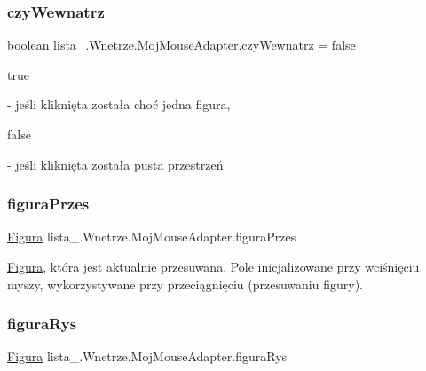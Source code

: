 \subsubsection{\texorpdfstring{czy\+Wewnatrz}{czyWewnatrz}}
{\footnotesize\ttfamily boolean lista\+\_.\+Wnetrze.\+Moj\+Mouse\+Adapter.\+czy\+Wewnatrz = false\hspace{0.3cm}{\ttfamily [private]}}


\begin{DoxyCode}
\textcolor{keyword}{true} 
\end{DoxyCode}
 -\/ jeśli kliknięta została choć jedna figura,
\begin{DoxyCode}
\textcolor{keyword}{false} 
\end{DoxyCode}
 -\/ jeśli kliknięta została pusta przestrzeń \mbox{\label{classlista__5_1_1_wnetrze_1_1_moj_mouse_adapter_a99de9fbdf459dc4783c71017a73cae3a}} 
\subsubsection{\texorpdfstring{figura\+Przes}{figuraPrzes}}
{\footnotesize\ttfamily \mbox{\hyperlink{interfacelista__5_1_1_figura}{Figura}} lista\+\_.\+Wnetrze.\+Moj\+Mouse\+Adapter.\+figura\+Przes\hspace{0.3cm}{\ttfamily [private]}}

\mbox{\hyperlink{interfacelista__5_1_1_figura}{Figura}}, która jest aktualnie przesuwana. Pole inicjalizowane przy wciśnięciu myszy, wykorzystywane przy przeciągnięciu (przesuwaniu figury). \mbox{\label{classlista__5_1_1_wnetrze_1_1_moj_mouse_adapter_a21bbd36a0f45068c966e26c532b2421c}} 
\subsubsection{\texorpdfstring{figura\+Rys}{figuraRys}}
{\footnotesize\ttfamily \mbox{\hyperlink{interfacelista__5_1_1_figura}{Figura}} lista\+\_.\+Wnetrze.\+Moj\+Mouse\+Adapter.\+figura\+Rys\hspace{0.3cm}{\ttfamily [private]}}


